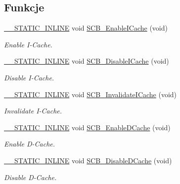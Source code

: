 \subsection*{Funkcje}
\begin{DoxyCompactItemize}
\item 
\hyperlink{cmsis__iccarm_8h_aba87361bfad2ae52cfe2f40c1a1dbf9c}{\+\_\+\+\_\+\+S\+T\+A\+T\+I\+C\+\_\+\+I\+N\+L\+I\+NE} void \hyperlink{group___c_m_s_i_s___core___cache_functions_gaf9e7c6c8e16ada1f95e5bf5a03505b68}{S\+C\+B\+\_\+\+Enable\+I\+Cache} (void)
\begin{DoxyCompactList}\small\item\em Enable I-\/\+Cache. \end{DoxyCompactList}\item 
\hyperlink{cmsis__iccarm_8h_aba87361bfad2ae52cfe2f40c1a1dbf9c}{\+\_\+\+\_\+\+S\+T\+A\+T\+I\+C\+\_\+\+I\+N\+L\+I\+NE} void \hyperlink{group___c_m_s_i_s___core___cache_functions_gaba757390852f95b3ac2d8638c717d8d8}{S\+C\+B\+\_\+\+Disable\+I\+Cache} (void)
\begin{DoxyCompactList}\small\item\em Disable I-\/\+Cache. \end{DoxyCompactList}\item 
\hyperlink{cmsis__iccarm_8h_aba87361bfad2ae52cfe2f40c1a1dbf9c}{\+\_\+\+\_\+\+S\+T\+A\+T\+I\+C\+\_\+\+I\+N\+L\+I\+NE} void \hyperlink{group___c_m_s_i_s___core___cache_functions_ga50d373a785edd782c5de5a3b55e30ff3}{S\+C\+B\+\_\+\+Invalidate\+I\+Cache} (void)
\begin{DoxyCompactList}\small\item\em Invalidate I-\/\+Cache. \end{DoxyCompactList}\item 
\hyperlink{cmsis__iccarm_8h_aba87361bfad2ae52cfe2f40c1a1dbf9c}{\+\_\+\+\_\+\+S\+T\+A\+T\+I\+C\+\_\+\+I\+N\+L\+I\+NE} void \hyperlink{group___c_m_s_i_s___core___cache_functions_ga63aa640d9006021a796a5dcf9c7180b6}{S\+C\+B\+\_\+\+Enable\+D\+Cache} (void)
\begin{DoxyCompactList}\small\item\em Enable D-\/\+Cache. \end{DoxyCompactList}\item 
\hyperlink{cmsis__iccarm_8h_aba87361bfad2ae52cfe2f40c1a1dbf9c}{\+\_\+\+\_\+\+S\+T\+A\+T\+I\+C\+\_\+\+I\+N\+L\+I\+NE} void \hyperlink{group___c_m_s_i_s___core___cache_functions_ga6468170f90d270caab8116e7a4f0b5fe}{S\+C\+B\+\_\+\+Disable\+D\+Cache} (void)
\begin{DoxyCompactList}\small\item\em Disable D-\/\+Cache. \end{DoxyCompactList}\item 

\end{DoxyCompactItemize}
